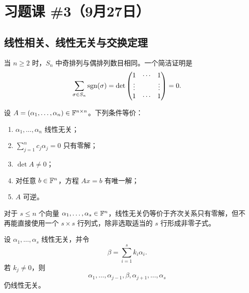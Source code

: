 \section{习题课 \#3（9月27日）}

\subsection{线性相关、线性无关与交换定理}

\begin{remark}
当 $n\geq2$ 时，$S_n$ 中奇排列与偶排列数目相同。一个简洁证明是
\begin{equation}
 \sum_{\sigma\in S_n}\operatorname{sgn}(\sigma)
 =\det\begin{pmatrix}
 1&\cdots&1\\
 \vdots&&\vdots\\
 1&\cdots&1
 \end{pmatrix}=0.
\end{equation}
\end{remark}

\begin{theorem}[方阵列向量线性无关的等价条件]
设 $A=(\alpha_1,\ldots,\alpha_n)\in\mathbb F^{n\times n}$。下列条件等价：
\begin{enumerate}
  \item $\alpha_1,\ldots,\alpha_n$ 线性无关；
  \item $\sum_{j=1}^n c_j\alpha_j=0$ 只有零解；
  \item $\det A\neq0$；
  \item 对任意 $b\in\mathbb F^n$，方程 $Ax=b$ 有唯一解；
  \item $A$ 可逆。
\end{enumerate}
\end{theorem}

\begin{remark}
对于 $s\leq n$ 个向量 $\alpha_1,\ldots,\alpha_s\in\mathbb F^n$，线性无关仍等价于齐次关系只有零解，但不再能直接使用一个 $s\times s$ 行列式，除非选取适当的 $s$ 行形成非零子式。
\end{remark}

\begin{proposition}[用线性组合替换一个向量]
设 $\alpha_1,\ldots,\alpha_s$ 线性无关，并令
\begin{equation}
 \beta=\sum_{i=1}^s k_i\alpha_i.
\end{equation}
若 $k_j\neq0$，则
\begin{equation}
 \alpha_1,\ldots,\alpha_{j-1},\beta,
 \alpha_{j+1},\ldots,\alpha_s
\end{equation}
仍线性无关。
\end{proposition}

